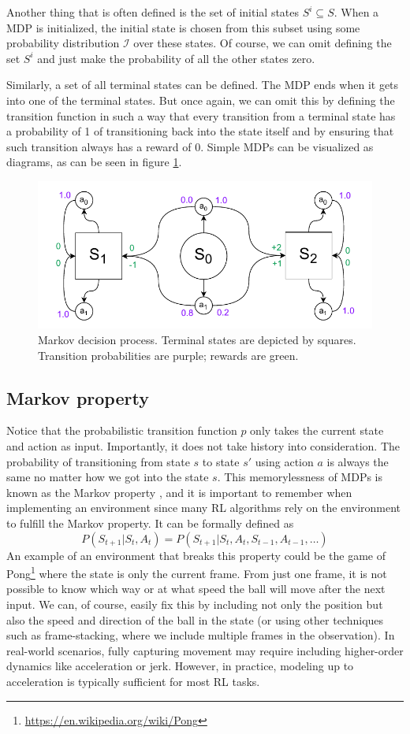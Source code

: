 \documentclass[
  digital,     %
  oneside,     %
  nosansbold,  %
  nocolorbold, %
  lof,         %
  lot,         %
]{fithesis4}
\begin{document}
Another thing that is often defined is the set of initial states $S^i \subseteq S$. When a MDP is initialized, the initial state is chosen from this subset using some probability distribution $\mathcal{I}$ over these states. Of course, we can omit defining the set $S^i$ and just make the probability of all the other states zero. \cite[p. 50]{GDRL}

Similarly, a set of all terminal states can be defined. The MDP ends when it gets into one of the terminal states. But once again, we can omit this by defining the transition function in such a way that every transition from a terminal state has a probability of 1 of transitioning back into the state itself and by ensuring that such transition always has a reward of 0.
Simple MDPs can be visualized as diagrams, as can be seen in figure \ref{fig:mdp}.

\begin{figure}
    \centering
    \includegraphics[width=0.75\linewidth]{diagrams/mdp.pdf}
    \caption{Markov decision process. Terminal states are depicted by squares. Transition probabilities are purple; rewards are green.}
    \label{fig:mdp}
\end{figure}

\subsection{Markov property}
Notice that the probabilistic transition function $p$ only takes the current state and action as input. Importantly, it does not take history into consideration. The probability of transitioning from state $s$ to state $s'$ using action $a$ is always the same no matter how we got into the state $s$. This memorylessness of MDPs is known as the Markov property \cite[p. 49]{GDRL}, and it is important to remember when implementing an environment since many RL algorithms rely on the environment to fulfill the Markov property. It can be formally defined as
\[
P(S_{t+1}|S_t,A_t)=P(S_{t+1}|S_t,A_t,S_{t-1},A_{t-1}, \dotsc)
\]
An example of an environment that breaks this property could be the game of Pong\footnote{\url{https://en.wikipedia.org/wiki/Pong}} where the state is only the current frame. From just one frame, it is not possible to know which way or at what speed the ball will move after the next input. We can, of course, easily fix this by including not only the position but also the speed and direction of the ball in the state (or using other techniques such as frame-stacking, where we include multiple frames in the observation). In real-world scenarios, fully capturing movement may require including higher-order dynamics like acceleration or jerk. However, in practice, modeling up to acceleration is typically sufficient for most RL tasks.
\end{document}
